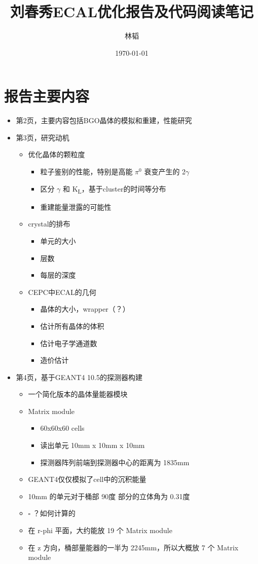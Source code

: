 \documentclass[11pt]{article}
\author{林韬}
\date{\today}
\title{刘春秀ECAL优化报告及代码阅读笔记}
\begin{document}
\maketitle
\tableofcontents


\section{报告主要内容}
\label{sec:org820cb76}

\begin{itemize}
\item 第2页，主要内容包括BGO晶体的模拟和重建，性能研究
\item 第3页，研究动机
\begin{itemize}
\item 优化晶体的颗粒度
\begin{itemize}
\item 粒子鉴别的性能，特别是高能 \(\pi^0\) 衰变产生的 2\(\gamma\)
\item 区分 \(\gamma\) 和 K\textsubscript{L}，基于cluster的时间等分布
\item 重建能量泄露的可能性
\end{itemize}
\item crystal的排布
\begin{itemize}
\item 单元的大小
\item 层数
\item 每层的深度
\end{itemize}
\item CEPC中ECAL的几何
\begin{itemize}
\item 晶体的大小，wrapper（？）
\item 估计所有晶体的体积
\item 估计电子学通道数
\item 造价估计
\end{itemize}
\end{itemize}
\item 第4页，基于GEANT4 10.5的探测器构建
\begin{itemize}
\item 一个简化版本的晶体量能器模块
\item Matrix module
\begin{itemize}
\item 60x60x60 cells
\item 读出单元 10mm x 10mm x 10mm
\item 探测器阵列前端到探测器中心的距离为 1835mm
\end{itemize}
\item GEANT4仅仅模拟了cell中的沉积能量
\item 10mm 的单元对于桶部 90度 部分的立体角为 0.31度
\item{$\square$} ？如何计算的
\item 在 r-phi 平面，大约能放 19 个 Matrix module
\item 在 z 方向，桶部量能器的一半为 2245mm，所以大概放 7 个 Matrix module
\end{itemize}
\end{itemize}
\end{document}

